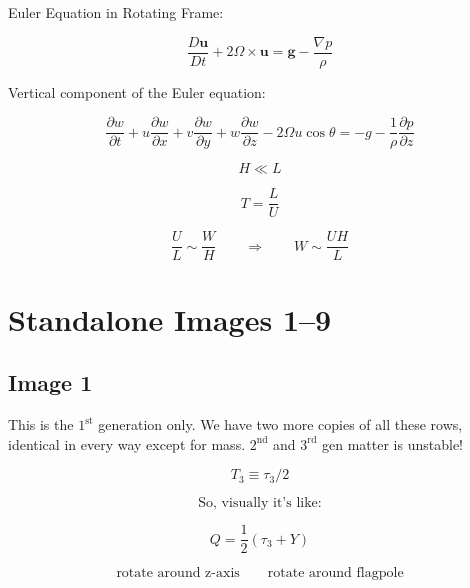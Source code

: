 \documentclass[11pt]{article}
\begin{document}
Euler Equation in Rotating Frame:

\[
\frac{D\mathbf{u}}{Dt}+2\Omega\times\mathbf{u}
=
\mathbf{g}-\frac{\nabla p}{\rho}
\]

Vertical component of the Euler equation:

\[
\frac{\partial w}{\partial t}
+u\frac{\partial w}{\partial x}
+v\frac{\partial w}{\partial y}
+w\frac{\partial w}{\partial z}
-2\Omega u\cos\theta
=
-g-\frac{1}{\rho}\frac{\partial p}{\partial z}
\]

\[
H \ll L
\]

\[
T=\frac{L}{U}
\]

\[
\frac{U}{L}\sim\frac{W}{H}
\qquad\Rightarrow\qquad
W\sim \frac{UH}{L}
\]

\clearpage
\section*{Standalone Images 1--9}

\subsection*{Image 1}
This is the $1^{\text{st}}$ generation only. We have two more copies of all these rows, identical in every way except for mass. $2^{\text{nd}}$ and $3^{\text{rd}}$ gen matter is unstable!

\begin{center}
\small
{}
\end{center}

\[
T_3 \equiv \tau_3/2
\]

\[
\text{So, visually it's like:}
\]

\[
Q = \frac{1}{2}\left(\tau_3 + Y\right)
\]

\[
\text{rotate around z-axis}
\qquad
\text{rotate around flagpole}
\]
\end{document}
